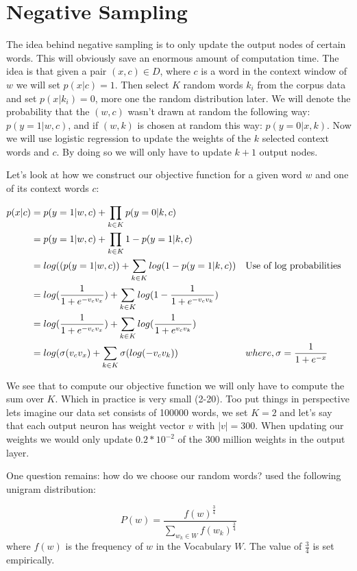 \section{Negative Sampling}
The idea behind negative sampling is to only update the output nodes of certain words. This will obviously save an enormous amount of computation time. The idea is that given a pair $(x,c) \in D$, where $c$ is a word in the context window of $w$ we will set $p(x|c) =1$. Then select $K$ random words $k_i$ from the corpus data and set $p(x|k_i) = 0$, more one the random distribution later. We will denote the probability that the $(w,c)$ wasn't drawn at random the following way: $p(y=1|w,c)$, and if $(w,k) $ is chosen at random this way: $p(y=0|x,k)$.  Now we will use logistic regression to update the weights of the $k$ selected context words and $c$. By doing so we will only have to update $k+1$ output nodes.

Let's look at how we construct our objective function for a given word $w$ and one of its context words $c$: 

\begin{align*}
p(x|c) &= p(y=1|w,c) + \prod_{k\in K} p(y=0|k,c) 
\\&= p(y=1|w,c) + \prod_{k\in K} 1- p(y=1|k,c) 
\\&= log((p(y=1|w,c)) + \sum_{k\in K} log(1- p(y=1|k,c)) &&\text{Use of log probabilities}
\\&=  log(\frac{1}{1+e^{-v_c v_x }})  + \sum_{k\in K} log(1-\frac{1}{1+e^{-v_c v_k}}) 
\\&=  log(\frac{1}{1+e^{-v_c v_x }})  + \sum_{k\in K} log(\frac{1}{1+e^{v_c v_k }})
\\&= log(\sigma(v_c v_x ) + \sum_{k\in K} \sigma(log(-v_c v_k )) &&\text{$ where, \sigma = \frac{1}{1+e^{-x}}$}
\end{align*}

We see that to compute our objective function we will only have to compute the sum over $K$. Which in practice is very small (2-20). Too put things in perspective lets imagine our data set consists of 100000 words, we set $K=2$ and let's say that each output neuron has weight vector $v$ with $|v| = 300$. When updating our weights we would only update  $0.2*10^{-2}$ of the 300 million weights in the output layer. 

One question remains: how do we choose our random words? \cite{mikolov2} used the following unigram distribution:
 
 \begin{equation}
P(w)=\frac{f(w)^{\frac{3}{4}}}{\sum_{w_k\in W} f(w_k)^{\frac{3}{4}}}
\end{equation}
where $f(w)$ is the frequency of $w$ in the Vocabulary $W$. The value of $\frac{3}{4}$ is set empirically.

